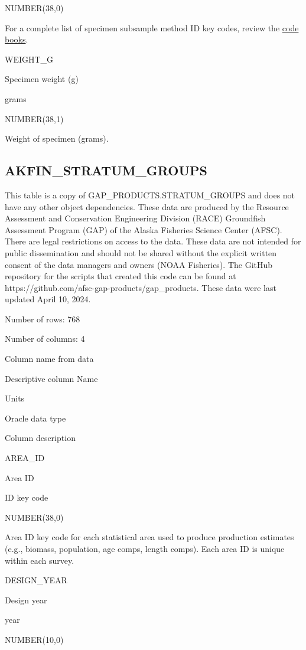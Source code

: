 \documentclass[
  letterpaper,
  oneside,
  open=any]{scrbook}
\begin{document}
NUMBER(38,0)

For a complete list of specimen subsample method ID key codes, review
the
\href{https://www.fisheries.noaa.gov/resource/document/groundfish-survey-species-code-manual-and-data-codes-manual}{code
books}.

WEIGHT\_G

Specimen weight (g)

grams

NUMBER(38,1)

Weight of specimen (grams).

\hypertarget{akfin_stratum_groups}{%
\subsection{AKFIN\_STRATUM\_GROUPS}\label{akfin_stratum_groups}}

This table is a copy of GAP\_PRODUCTS.STRATUM\_GROUPS and does not have
any other object dependencies. These data are produced by the Resource
Assessment and Conservation Engineering Division (RACE) Groundfish
Assessment Program (GAP) of the Alaska Fisheries Science Center (AFSC).
There are legal restrictions on access to the data. These data are not
intended for public dissemination and should not be shared without the
explicit written consent of the data managers and owners (NOAA
Fisheries). The GitHub repository for the scripts that created this code
can be found at https://github.com/afsc-gap-products/gap\_products.
These data were last updated April 10, 2024.

Number of rows: 768

Number of columns: 4

Column name from data

Descriptive column Name

Units

Oracle data type

Column description

AREA\_ID

Area ID

ID key code

NUMBER(38,0)

Area ID key code for each statistical area used to produce production
estimates (e.g., biomass, population, age comps, length comps). Each
area ID is unique within each survey.

DESIGN\_YEAR

Design year

year

NUMBER(10,0)
\end{document}
